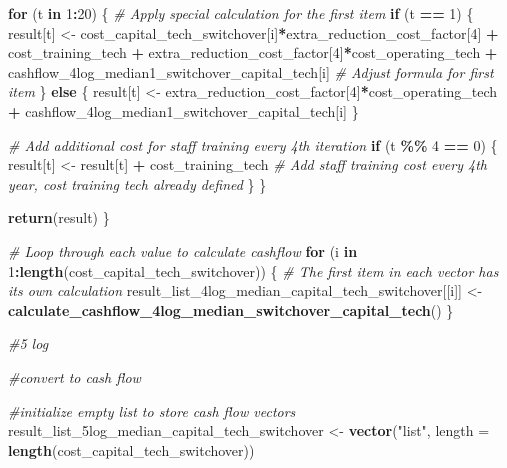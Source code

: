 \documentclass[
]{article}
\newenvironment{Shaded}{\begin{snugshade}}{\end{snugshade}}
\newcommand{\AttributeTok}[1]{\textcolor[rgb]{0.13,0.29,0.53}{#1}}
\newcommand{\CommentTok}[1]{\textcolor[rgb]{0.56,0.35,0.01}{\textit{#1}}}
\newcommand{\ControlFlowTok}[1]{\textcolor[rgb]{0.13,0.29,0.53}{\textbf{#1}}}
\newcommand{\DecValTok}[1]{\textcolor[rgb]{0.00,0.00,0.81}{#1}}
\newcommand{\FunctionTok}[1]{\textcolor[rgb]{0.13,0.29,0.53}{\textbf{#1}}}
\newcommand{\NormalTok}[1]{#1}
\newcommand{\OtherTok}[1]{\textcolor[rgb]{0.56,0.35,0.01}{#1}}
\newcommand{\SpecialCharTok}[1]{\textcolor[rgb]{0.81,0.36,0.00}{\textbf{#1}}}
\newcommand{\StringTok}[1]{\textcolor[rgb]{0.31,0.60,0.02}{#1}}
\begin{document}
\begin{Shaded}
\begin{Highlighting}[]
  \ControlFlowTok{for}\NormalTok{ (t }\ControlFlowTok{in} \DecValTok{1}\SpecialCharTok{:}\DecValTok{20}\NormalTok{) \{}
    \CommentTok{\# Apply special calculation for the first item}
    \ControlFlowTok{if}\NormalTok{ (t }\SpecialCharTok{==} \DecValTok{1}\NormalTok{) \{}
\NormalTok{      result[t] }\OtherTok{\textless{}{-}}\NormalTok{ cost\_capital\_tech\_switchover[i]}\SpecialCharTok{*}\NormalTok{extra\_reduction\_cost\_factor[}\DecValTok{4}\NormalTok{] }\SpecialCharTok{+}\NormalTok{ cost\_training\_tech }\SpecialCharTok{+}\NormalTok{ extra\_reduction\_cost\_factor[}\DecValTok{4}\NormalTok{]}\SpecialCharTok{*}\NormalTok{cost\_operating\_tech }\SpecialCharTok{+}\NormalTok{ cashflow\_4log\_median1\_switchover\_capital\_tech[i] }\CommentTok{\# Adjust formula for first item}
\NormalTok{    \} }\ControlFlowTok{else}\NormalTok{ \{}
\NormalTok{      result[t] }\OtherTok{\textless{}{-}}\NormalTok{ extra\_reduction\_cost\_factor[}\DecValTok{4}\NormalTok{]}\SpecialCharTok{*}\NormalTok{cost\_operating\_tech }\SpecialCharTok{+}\NormalTok{ cashflow\_4log\_median1\_switchover\_capital\_tech[i]}
\NormalTok{    \}}
    
    \CommentTok{\# Add additional cost for staff training every 4th iteration}
    \ControlFlowTok{if}\NormalTok{ (t }\SpecialCharTok{\%\%} \DecValTok{4} \SpecialCharTok{==} \DecValTok{0}\NormalTok{) \{}
\NormalTok{      result[t] }\OtherTok{\textless{}{-}}\NormalTok{ result[t] }\SpecialCharTok{+}\NormalTok{ cost\_training\_tech  }\CommentTok{\# Add staff training cost every 4th year, cost training tech already defined}
\NormalTok{    \}}
\NormalTok{  \}}
  
  \FunctionTok{return}\NormalTok{(result)}
\NormalTok{\}}

\CommentTok{\# Loop through each value to calculate cashflow}
\ControlFlowTok{for}\NormalTok{ (i }\ControlFlowTok{in} \DecValTok{1}\SpecialCharTok{:}\FunctionTok{length}\NormalTok{(cost\_capital\_tech\_switchover)) \{}
  \CommentTok{\# The first item in each vector has its own calculation}
\NormalTok{  result\_list\_4log\_median\_capital\_tech\_switchover[[i]] }\OtherTok{\textless{}{-}} \FunctionTok{calculate\_cashflow\_4log\_median\_switchover\_capital\_tech}\NormalTok{()}
\NormalTok{\}}



\CommentTok{\#5 log }

\CommentTok{\#convert to cash flow}


\CommentTok{\#initialize empty list to store cash flow vectors}
\NormalTok{result\_list\_5log\_median\_capital\_tech\_switchover }\OtherTok{\textless{}{-}} \FunctionTok{vector}\NormalTok{(}\StringTok{"list"}\NormalTok{, }\AttributeTok{length =} \FunctionTok{length}\NormalTok{(cost\_capital\_tech\_switchover))}


\end{Highlighting}
\end{Shaded}
\end{document}
